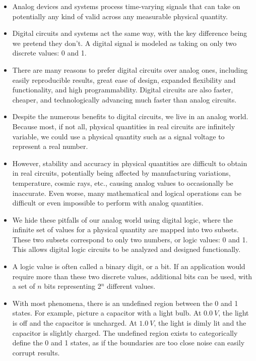 \documentclass[10pt,a4paper]{article}
\begin{document}
\begin{itemize}
\item Analog devices and systems process time-varying signals that can take on potentially any kind of valid across any measurable physical quantity. 
\item Digital circuits and systems act the same way, with the key difference being we pretend they don't. A digital signal is modeled as taking on only two discrete values: 0 and 1. 
\item There are many reasons to prefer digital circuits over analog ones, including easily reproducible results, great ease of design, expanded flexibility and functionality, and high programmability. Digital circuits are also faster, cheaper, and technologically advancing much faster than analog circuits. 
\item Despite the numerous benefits to digital circuits, we live in an analog world. Because most, if not all, physical quantities in real circuits are infinitely variable, we could use a physical quantity such as a signal voltage to represent a real number. 
\item However, stability and accuracy in physical quantities are difficult to obtain in real circuits, potentially being affected by manufacturing variations, temperature, cosmic rays, etc., causing analog values to occasionally be inaccurate. Even worse, many mathematical and logical operations can be difficult or even impossible to perform with analog quantities. 
\item We hide these pitfalls of our analog world using digital logic, where the infinite set of values for a physical quantity are mapped into two subsets. These two subsets correspond to only two numbers, or logic values: 0 and 1. This allows digital logic circuits to be analyzed and designed functionally. 
\item A logic value is often called a binary digit, or a bit. If an application would require more than these two discrete values, additional bits can be used, with a set of $n$ bits representing 2$^n$ different values. 
\item With most phenomena, there is an undefined region between the 0 and 1 states. For example, picture a capacitor with a light bulb. At $\SI{0.0}{V}$, the light is off and the capacitor is uncharged. At $\SI{1.0}{V}$, the light is dimly lit and the capacitor is slightly charged. The undefined region exists to categorically define the 0 and 1 states, as if the boundaries are too close noise can easily corrupt results. 

\end{itemize}
\end{document}
